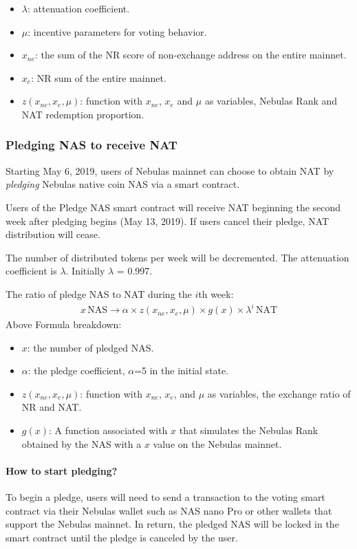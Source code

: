 \begin{itemize}
	\item $\lambda$: attenuation coefficient.
	\item $\mu$: incentive parameters for voting behavior.
	\item $x_{ne}$: the sum of the NR score of non-exchange address on the entire mainnet.
	\item $x_{e}$: NR sum of the entire mainnet.
	\item $z(x_{ne},x_{e},\mu)$: function with $x_{ne}$, $x_{e}$ and $\mu$ as variables, Nebulas Rank and NAT redemption proportion.
\end{itemize}

\subsubsection{Pledging NAS to receive NAT}

Starting May 6, 2019, users of Nebulas mainnet can choose to obtain NAT by
\emph{pledging} Nebulas native coin NAS via a smart contract.

Users of the Pledge NAS smart contract will receive NAT beginning the second week after pledging begins (May 13, 2019). If users cancel their pledge, NAT distribution will cease.

The number of distributed tokens per week will be decremented. The attenuation coefficient is $\lambda$. Initially $\lambda$ = 0.997.

The ratio of pledge NAS to NAT during the $i$th week:
\begin{align}
x\,\text{NAS} \rightarrow \alpha \times z(x_{ne},x_{e},\mu)\times g(x) \times
  \lambda^{i}\,\text{NAT}
\end{align}
Above Formula breakdown:

\begin{itemize}
	\item $x$: the number of pledged NAS.
	\item $\alpha$: the pledge coefficient, $\alpha$=5 in the initial state.
	\item $z(x_{ne},x_{e},\mu)$: function with $x_{ne}$, $x_{e}$, and $\mu$ as variables, the exchange ratio of NR and NAT.
	\item $g(x)$: A function associated with $x$ that simulates the Nebulas Rank obtained by the NAS with a $x$ value on the Nebulas mainnet.
\end{itemize}


\paragraph{How to start pledging?}
To begin a pledge, users will need to send a transaction to the voting smart contract via their Nebulas wallet such as NAS nano Pro or other wallets that support the Nebulas mainnet. In return, the pledged NAS will be locked in the smart contract until the pledge is canceled by the user.

